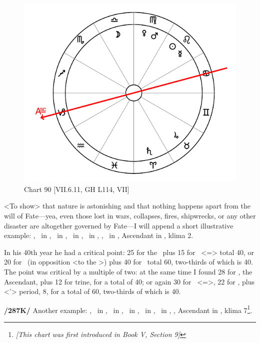 \begin{figure}
\centering
\vspace{0pt}
\includegraphics[width=.68\textwidth]{charts/7_6_11}
\caption{Chart 90 [VII.6.11, GH L114, VII] }
\label{fig:chart90}
\end{figure} 

<To show> that nature is astonishing and that nothing happens apart from the will of Fate—yea, even those lost in wars, collapses, fires, shipwrecks, or any other disaster are altogether governed by Fate—I will append a short illustrative example: \Sun, \Mercury\, in \Leo, \Moon\, in \Libra, \Saturn\, in \Aries, \Jupiter\, in \Taurus, \Mars, \Venus\, in \Virgo, Ascendant in \Capricorn, klima 2. 

In his 40th year he had a critical point: 25 for the \Moon\, plus 15 for \Aries\, <=\Mars> total 40, or 20 for \Aries\, (in opposition <to the \Moon>) plus 40 for \Libra\, total 60, two-thirds of which is 40. The point was critical by a multiple of two: at the same time I found 28 for \Capricorn, the Ascendant, plus 12 for \Jupiter trine, for a total of 40; or again 30 for \Capricorn\, <=\Saturn>, 22 for \Taurus, plus <\Venus’> period, 8, for a total of 60, two-thirds of which is 40.

\textbf{/287K/} Another example: \Sun, \Mercury\, in \Aquarius, \Moon\, in \Scorpio, \Saturn\, in \Cancer, \Jupiter\, in \Libra, \Venus\, in \Capricorn, \Mars, Ascendant in \Virgo, klima 7\footnote{\textit{[This chart was first introduced in Book V, Section 9]}}.

